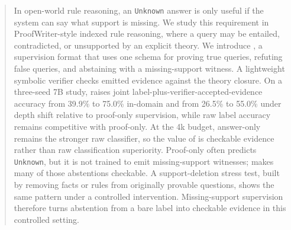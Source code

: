 \begin{abstract}
In open-world rule reasoning, an \texttt{Unknown} answer is only useful if the
system can say what support is missing. We study this requirement in
ProofWriter-style indexed rule reasoning, where a query may be entailed,
contradicted, or unsupported by an explicit theory. We introduce \model, a
supervision format that uses one schema for proving true queries, refuting false
queries, and abstaining with a missing-support witness. A lightweight symbolic
verifier checks emitted evidence against the theory closure. On a three-seed
7B study, \model{} raises joint label-plus-verifier-accepted-evidence accuracy
from 39.9\% to 75.0\% in-domain and from 26.5\% to 55.0\% under depth shift
relative to proof-only supervision, while raw label accuracy remains
competitive with proof-only. At the 4k budget, answer-only remains the stronger
raw classifier, so the value of \model{} is checkable evidence rather than raw
classification superiority. Proof-only often predicts \texttt{Unknown}, but it
is not trained to emit missing-support witnesses; \model{} makes many of those
abstentions checkable. A support-deletion stress test, built by removing facts
or rules from originally provable questions, shows the same pattern under a
controlled intervention. Missing-support supervision therefore turns abstention
from a bare label into checkable evidence in this controlled setting.
\end{abstract}
